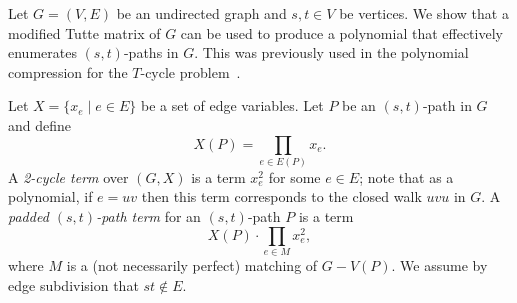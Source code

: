\documentclass{theoretics}
\begin{document}
Let $G=(V,E)$ be an undirected graph and $s, t \in V$ be vertices. We
show that a modified Tutte matrix of $G$ can be used to produce a
polynomial that effectively enumerates $(s,t)$-paths in $G$. This was
previously used in the polynomial compression for the $T$-cycle
problem~\cite{Wahlstrom13STACS}. 

Let $X=\{x_e \mid e \in E\}$ be a set of edge variables. 
Let $P$ be an $(s,t)$-path in $G$ and define
\[
  X(P) = \prod_{e \in E(P)} x_e.
\]
A \emph{2-cycle term} over $(G,X)$ is a term $x_e^2$ for some $e \in E$;
note that as a polynomial, if $e=uv$ then this term corresponds to the
closed walk $uvu$ in $G$. A \emph{padded $(s,t)$-path term} for an
$(s,t)$-path $P$ is a term
\[
  X(P) \cdot \prod_{e \in M} x_e^2,
\]
where $M$ is a (not necessarily perfect) matching of $G-V(P)$.
We assume by edge subdivision that $st \notin E$.
\end{document}
